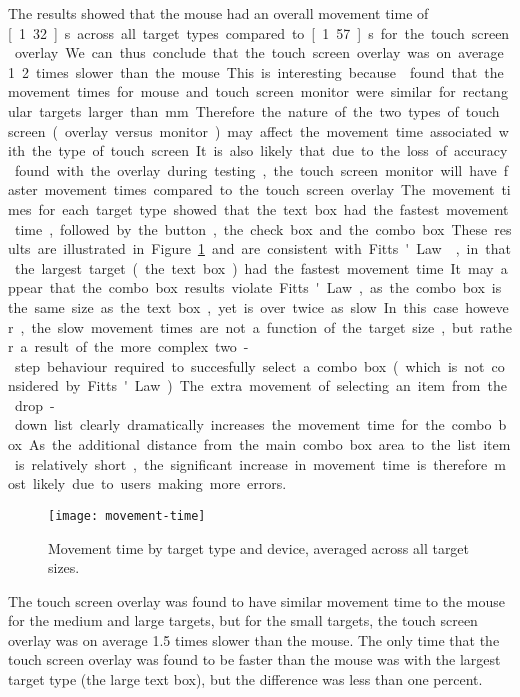 \documentclass{elsart}
\begin{document}
The results showed that the mouse had an overall movement time of
\unit[1.32]{s} across all target types compared to \unit[1.57]{s} for
the touch screen overlay. We can thus conclude that the touch screen
overlay was on average 1.2 times slower than the mouse. This is
interesting because \citet{Sear-A-1991-IJMMS} found that the movement
times for mouse and touch screen monitor were similar for rectangular
targets larger than \unit[2]{mm}. Therefore the nature of the two types
of touch screen (overlay versus monitor) may affect the movement time
associated with the type of touch screen. It is also likely that due to
the loss of accuracy found with the overlay during testing, the touch
screen monitor will have faster movement times compared to the touch
screen overlay.

The movement times for each target type showed that the text box had the
fastest movement time, followed by the button, the check box and the
combo box. These results are illustrated in
Figure~\ref{fig-movement-time} and are consistent with Fitts' Law
\citep{Fitt-PM-1954-Law}, in that the largest target (the text box) had
the fastest movement time. It may appear that the combo box results
violate Fitts' Law, as the combo box is the same size as the text box,
yet is over twice as slow. In this case however, the slow movement times
are not a function of the target size, but rather a result of the more
complex two-step behaviour required to succesfully select a combo box
(which is not considered by Fitts' Law). The extra movement of selecting
an item from the drop-down list clearly dramatically increases the
movement time for the combo box. As the additional distance from the
main combo box area to the list item is relatively short, the
significant increase in movement time is therefore most likely due to
users making more errors.


\begin{figure}
	\centering
	\texttt{[image: movement-time]}
	\caption{Movement time by target type and device, averaged across
	all target sizes.}
	\label{fig-movement-time}
\end{figure}


The touch screen overlay was found to have similar movement time to the
mouse for the medium and large targets, but for the small targets, the
touch screen overlay was on average 1.5 times slower than the mouse. The
only time that the touch screen overlay was found to be faster than the
mouse was with the largest target type (the large text box), but the
difference was less than one percent.
\end{document}
